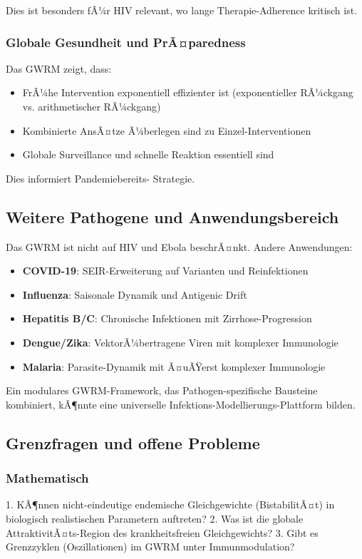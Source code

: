 ﻿\documentclass[a4paper,12pt]{article}
\theoremstyle{definition}
\begin{document}
Dies ist besonders fÃ¼r HIV relevant, wo lange Therapie-Adherence kritisch ist.

\subsubsection{Globale Gesundheit und PrÃ¤paredness}
Das GWRM zeigt, dass:
\begin{itemize}
\item FrÃ¼he Intervention exponentiell effizienter ist (exponentieller RÃ¼ckgang vs. arithmetischer RÃ¼ckgang)
\item Kombinierte AnsÃ¤tze Ã¼berlegen sind zu Einzel-Interventionen
\item Globale Surveillance und schnelle Reaktion essentiell sind
\end{itemize}

Dies informiert Pandemiebereits- Strategie.

\subsection{Weitere Pathogene und Anwendungsbereich}

Das GWRM ist nicht auf HIV und Ebola beschrÃ¤nkt. Andere Anwendungen:
\begin{itemize}
\item \textbf{COVID-19}: SEIR-Erweiterung auf Varianten und Reinfektionen
\item \textbf{Influenza}: Saisonale Dynamik und Antigenic Drift
\item \textbf{Hepatitis B/C}: Chronische Infektionen mit Zirrhose-Progression
\item \textbf{Dengue/Zika}: VektorÃ¼bertragene Viren mit komplexer Immunologie
\item \textbf{Malaria}: Parasite-Dynamik mit Ã¤uÃŸerst komplexer Immunologie
\end{itemize}

Ein modulares GWRM-Framework, das Pathogen-spezifische Bausteine kombiniert, kÃ¶nnte eine universelle Infektions-Modellierungs-Plattform bilden.

\subsection{Grenzfragen und offene Probleme}

\subsubsection{Mathematisch}
1. KÃ¶nnen nicht-eindeutige endemische Gleichgewichte (BistabilitÃ¤t) in biologisch realistischen Parametern auftreten?
2. Was ist die globale AttraktivitÃ¤ts-Region des krankheitsfreien Gleichgewichts?
3. Gibt es Grenzzyklen (Oszillationen) im GWRM unter Immunmodulation?
\end{document}
